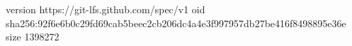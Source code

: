version https://git-lfs.github.com/spec/v1
oid sha256:92f6e6b0c29fd69cab5beec2cb206dc4a4e3f997957db27be416f8498895e36e
size 1398272
